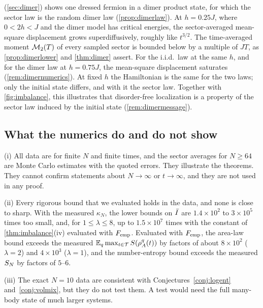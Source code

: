  (\cref{sec:dimer}) shows one dressed fermion in a dimer product state, for which the sector law is the
random dimer law (\cref{prop:dimerlaw}).  At $h=0.25J$, where $0<2h<J$ and the dimer model has critical energies, the
sector-averaged mean-square displacement grows superdiffusively, roughly like $t^{3/2}$.  The time-averaged moment
$\mathcal{M}_2(T)$ of every sampled sector is bounded below by a multiple of $JT$, as \cref{prop:dimerlower} and
\cref{thm:dimer} assert.  For the i.i.d.\ law at the same $h$, and for the dimer law at $h=0.75J$, the mean-square displacement
saturates (\cref{rem:dimernumerics}).  At fixed $h$ the Hamiltonian is the same for the two laws; only the initial state
differs, and with it the sector law.  Together with \cref{fig:imbalance}, this illustrates that disorder-free localization is a
property of the sector law induced by the initial state (\cref{rem:dimermessage}).

\subsection{What the numerics do and do not show}\label{sec:numerics:summary}

\begin{remark}[Scope]\label{rem:num-scope}
(i) All data are for finite $N$ and finite times, and the sector averages for $N\ge64$ are Monte Carlo estimates
with the quoted errors.  They illustrate the theorems.  They cannot confirm statements about $N\to\infty$ or
$t\to\infty$, and they are not used in any proof.

(ii) Every rigorous bound that we evaluated holds in the data, and none is close to sharp.  With the measured
$\kappa_N$, the lower bounds on $\bar I$ are $1.4\times10^2$ to $3\times10^5$ times too small, and, for $1\le\lambda\le8$, up to
$1.5\times10^7$ times with the constant of \cref{thm:imbalance}(iv) evaluated with $F_{\mathrm{emp}}$.  Evaluated with $F_{\mathrm{emp}}$, the area-law bound exceeds the
measured $\mathbb{E}_q\max_{t\in\mathcal T}S(\rho^q_A(t))$ by factors of about $8\times10^2$ ($\lambda=2$) and $4\times10^3$
($\lambda=1$), and the number-entropy bound exceeds the measured $S_{N}$ by factors of $5$--$6$.

(iii) The exact $N=10$ data are consistent with Conjectures~\ref{conj:logent} and~\ref{conj:volmix}, but they do
not test them.  A test would need the full many-body state of much larger systems.
\end{remark}
